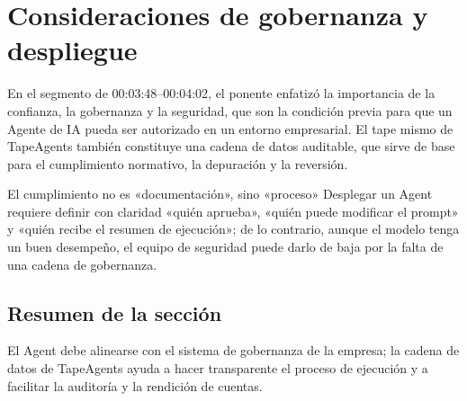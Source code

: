 \section{Consideraciones de gobernanza y despliegue}
En el segmento de 00:03:48--00:04:02, el ponente enfatizó la importancia de la confianza, la gobernanza y la seguridad, que son la condición previa para que un Agente de IA pueda ser autorizado en un entorno empresarial. El tape mismo de TapeAgents también constituye una cadena de datos auditable, que sirve de base para el cumplimiento normativo, la depuración y la reversión.

\begin{warningbox}{El cumplimiento no es «documentación», sino «proceso»}
Desplegar un Agent requiere definir con claridad «quién aprueba», «quién puede modificar el prompt» y «quién recibe el resumen de ejecución»; de lo contrario, aunque el modelo tenga un buen desempeño, el equipo de seguridad puede darlo de baja por la falta de una cadena de gobernanza.
\end{warningbox}

\subsection{Resumen de la sección}
El Agent debe alinearse con el sistema de gobernanza de la empresa; la cadena de datos de TapeAgents ayuda a hacer transparente el proceso de ejecución y a facilitar la auditoría y la rendición de cuentas.
